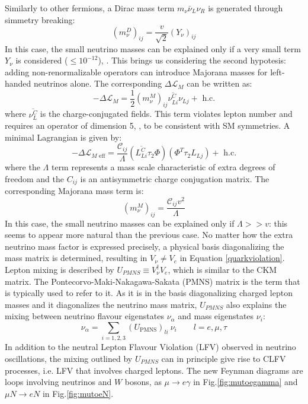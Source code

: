 Similarly to other fermions, a Dirac mass term $m_{\nu} \bar{\nu}_L \nu_R$ is generated through simmetry breaking:
\begin{equation}
\left(m_\nu^D\right)_{i j}=\frac{v}{\sqrt{2}}\left(Y_\nu\right)_{i j}
\end{equation}
In this case, the small neutrino masses can be explained only if a very small term $Y_\nu$ is considered ($\leq 10^{-12}$), \cite{clfv_signorelli}. This brings us considering the second hypotesis: adding non-renormalizable operators can introduce Majorana masses for left-handed neutrinos alone. The corresponding $\Delta \mathscr{L}_M$ can be written as:
\begin{equation}
-\Delta \mathscr{L}_M=\frac{1}{2}\left(m_\nu^M\right)_{i j} \overline{\nu_{L i}^C} \nu_{L j}+\text{ h.c.}
\end{equation}
where $\overline{\nu_{L }^C} $ is the charge-conjugated fields. This term violates lepton number and requires an operator of dimension 5, \cite{wein}, to be consistent with SM symmetries. A minimal Lagrangian is given by:
\begin{equation}
-\Delta \mathscr{L}_{M \text { eff}}=\frac{\mathcal{C}_{i j}}{\Lambda}\left(\overline{L_{L i}^C} \tau_2 \Phi\right)\left(\Phi^T \tau_2 L_{L j}\right)+\text { h.c.}
\end{equation}
where the $\Lambda$ term represents a mass scale characteristic of extra degrees of freedom and the $C_{ij}$ is an antisymmetric charge conjugation matrix. The corresponding Majorana mass term is:
\begin{equation}
\left(m_\nu^M\right)_{i j}=\frac{\mathcal{C}_{i j} v^2}{\Lambda}
\end{equation}
In this case, the small neutrino masses can be explained only if $\Lambda > > v$: this seems to appear more natural than the previous case. No matter how the extra neutrino mass factor is expressed precisely, a physical basis diagonalizing the mass matrix is determined, resulting in $V_{\nu} \neq V_e$ in Equation \ref{quarkviolation}. Lepton mixing is described by $U_{PMNS} \equiv V_{\nu}^{\dagger} V_e$, which is similar to the CKM matrix. The Pontecorvo-Maki-Nakagawa-Sakata (PMNS) matrix is the term that is typically used to refer to it. As it is in the basis diagonalizing charged lepton masses and it diagonalizes the neutrino mass matrix, $U_{PMNS}$ also explains the mixing between neutrino flavour eigenstates $\nu_{\alpha}$ and mass eigenstates $\nu_i$:
\begin{equation}
\nu_\alpha=\sum_{i=1,2,3}\left(U_{\mathrm{PMNS}}\right)_{l i} \ \nu_i \qquad l=e, \mu, \tau
\end{equation}
In addition to the neutral Lepton Flavour Violation (LFV) observed in neutrino oscillations, the mixing outlined by $U_{PMNS}$ can in principle give rise to CLFV processes, i.e. LFV that involves charged leptons. The new Feynman diagrams are loops involving neutrinos and $W$ bosons, as $\mu \rightarrow e \gamma$ in Fig.\ref{fig:mutoegamma} and $\mu N \rightarrow e N$ in Fig.\ref{fig:mutoeN}. 



